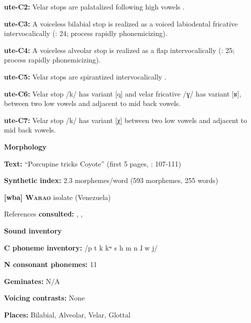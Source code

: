 \textbf{ute-C2:} Velar stops are palatalized following high vowels \citep[29]{Givón2011}.



\textbf{ute-C3:} A voiceless bilabial stop is realized as a voiced labiodental fricative intervocalically (\citealt{Givón2011}: 24; process rapidly phonemicizing).



\textbf{ute-C4:} A voiceless alveolar stop is realized as a flap intervocalically (\citealt{Givón2011}: 25; process rapidly phonemicizing).



\textbf{ute-C5:} Velar stops are spirantized intervocalically \citep[26-7]{Givón2011}.



\textbf{ute-C6:} Velar stop /k/ has variant [q] and velar fricative /ɣ/ has variant [ʁ], between two low vowels and adjacent to mid back vowels.



\textbf{ute-C7:} Velar stop /k/ has variant [χ] between two low vowels and adjacent to mid back vowels.



\textbf{Morphology}



\textbf{Text:} “Porcupine tricks Coyote” (first 5 pages, \citealt{Givón2013}: 107-111)



\textbf{Synthetic index:} 2.3 morphemes/word (593 morphemes, 255 words)



\textbf{[wba] \textsc{Warao}}  isolate (Venezuela)



References \textbf{consulted:} \citet{Arinterol2000}, \citet{Osborn1966}, \citet{Romero-Figeroa1997}



\textbf{Sound inventory}



\textbf{C phoneme inventory:} /p t k kʷ s h m n ɺ w j/



\textbf{N consonant phonemes:} 11



\textbf{Geminates:} N/A



\textbf{Voicing contrasts:} None



\textbf{Places:} Bilabial, Alveolar, Velar, Glottal



